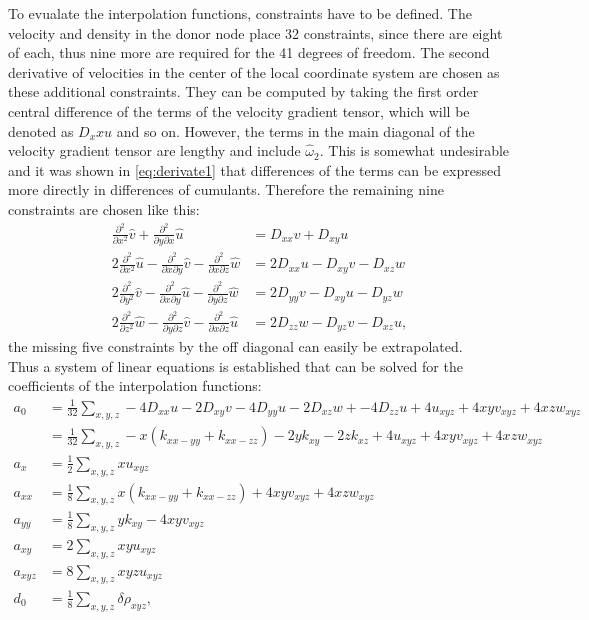 To evualate the interpolation functions, constraints have to be defined. The velocity and density in the donor node place 32 constraints, since there are eight of each, thus nine more are required for the 41 degrees of freedom. The second derivative of velocities in the center of the local coordinate system are chosen as these additional constraints. They can be computed by taking the first order central difference of the terms of the velocity gradient tensor, which will be denoted as $D_xx u$ and so on. However, the terms in the main diagonal of the velocity gradient tensor are lengthy and include $\hat{\omega}_2$. This is somewhat undesirable and it was shown in \eqref{eq:derivate1} that differences of the terms can be expressed more directly in differences of cumulants. Therefore the remaining nine constraints are chosen like this:
\begin{align}
\frac{\partial^2}{\partial x^2} \hat{v}+\frac{\partial^2}{\partial y \partial x} \hat{u} &= D_{xx} v + D_{xy} u \label{eq:const1} \\
2\frac{\partial^2}{\partial x^2} \hat{u} - \frac{\partial^2}{\partial x \partial y} \hat{v} - \frac{\partial^2}{\partial x \partial z} \hat{w} &= 2 D_{xx}u- D_{xy}v - D_{xz}w \\
2\frac{\partial^2}{\partial y^2} \hat{v} - \frac{\partial^2}{\partial x \partial y} \hat{u} - \frac{\partial^2}{\partial y \partial z} \hat{w} &= 2 D_{yy}v- D_{xy}u - D_{yz}w \\
2\frac{\partial^2}{\partial z^2} \hat{w} - \frac{\partial^2}{\partial y \partial z} \hat{v} - \frac{\partial^2}{\partial x \partial z} \hat{u} &= 2 D_{zz}w- D_{yz}v - D_{xz}u, \label{eq:const2}
\end{align}
the missing five constraints by the off diagonal can easily be extrapolated. \\
Thus a system of linear equations is established that can be solved for the coefficients of the interpolation functions:
\begin{align}
a_0 &= \frac{1}{32} \sum_{x,y,z}  -4 D_{xx}u-2 D_{xy}v -4D_{yy}u- 2 D_{xz}w + -4 D_{zz}u + 4 u_{xyz} + 4xyv_{xyz} + 4 xzw_{xyz} \\
&= \frac{1}{32} \sum_{x,y,z}  -x\left(k_{xx-yy} + k_{xx-zz}\right) - 2yk_{xy} -2zk_{xz} + 4 u_{xyz} + 4xyv_{xyz} + 4 xzw_{xyz} \\
a_x &= \frac{1}{2} \sum_{x,y,z} x u_{xyz} \\
a_{xx} &= \frac{1}{8} \sum_{x,y,z}x\left(k_{xx-yy}+k_{xx-zz}\right) + 4xyv_{xyz}+ 4 xzw_{xyz} \\
a_{yy} &= \frac{1}{8} \sum_{x,y,z}y k_{xy} - 4 xy v_{xyz} \\
a_{xy} &= 2 \sum_{x,y,z} xyu_{xyz} \\
a_{xyz} &= 8 \sum_{x,y,z} xyzu_{xyz} \\
d_0 &= \frac{1}{8} \sum_{x,y,z} \delta \rho_{xyz},
\end{align}
